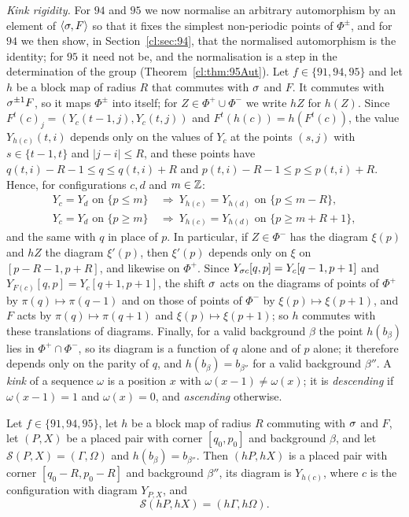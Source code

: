 \emph{Kink rigidity.} For $94$ and $95$ we now normalise an arbitrary automorphism by an element of $\langle\sigma,F\rangle$ so that it fixes the simplest non-periodic points of $\Phi^\pm$, and for $94$ we then show, in Section~\ref{cl:sec:94}, that the normalised automorphism is the identity; for $95$ it need not be, and the normalisation is a step in the determination of the group (Theorem~\ref{cl:thm:95Aut}). Let $f\in\{91,94,95\}$ and let $h$ be a block map of radius $R$ that commutes with $\sigma$ and $F$. It commutes with $\sigma^{\pm1}F$, so it maps $\Phi^\pm$ into itself; for $Z\in\Phi^+\cup\Phi^-$ we write $hZ$ for $h(Z)$. Since $F^t(c)_j=(Y_c(t-1,j),Y_c(t,j))$ and $F^t(h(c))=h(F^t(c))$, the value $Y_{h(c)}(t,i)$ depends only on the values of $Y_c$ at the points $(s,j)$ with $s\in\{t-1,t\}$ and $|j-i|\le R$, and these points have $q(t,i)-R-1\le q\le q(t,i)+R$ and $p(t,i)-R-1\le p\le p(t,i)+R$. Hence, for configurations $c,d$ and $m\in\mathbb{Z}$:
\begin{equation}\label{cl:eq:loc}
\begin{aligned}
Y_c=Y_d\text{ on }\{p\le m\}&\ \Rightarrow\ Y_{h(c)}=Y_{h(d)}\text{ on }\{p\le m-R\},\\
Y_c=Y_d\text{ on }\{p\ge m\}&\ \Rightarrow\ Y_{h(c)}=Y_{h(d)}\text{ on }\{p\ge m+R+1\},
\end{aligned}
\end{equation}
and the same with $q$ in place of $p$.
In particular, if $Z\in\Phi^-$ has the diagram $\xi(p)$ and $hZ$ the diagram $\xi'(p)$, then $\xi'(p)$ depends only on $\xi$ on $[p-R-1,p+R]$, and likewise on $\Phi^+$. Since $Y_{\sigma c}[q,p]=Y_c[q-1,p+1]$ and $Y_{F(c)}[q,p]=Y_c[q+1,p+1]$, the shift $\sigma$ acts on the diagrams of points of $\Phi^+$ by $\pi(q)\mapsto\pi(q-1)$ and on those of points of $\Phi^-$ by $\xi(p)\mapsto\xi(p+1)$, and $F$ acts by $\pi(q)\mapsto\pi(q+1)$ and $\xi(p)\mapsto\xi(p+1)$; so $h$ commutes with these translations of diagrams. Finally, for a valid background $\beta$ the point $h(b_\beta)$ lies in $\Phi^+\cap\Phi^-$, so its diagram is a function of $q$ alone and of $p$ alone; it therefore depends only on the parity of $q$, and $h(b_\beta)=b_{\beta''}$ for a valid background $\beta''$. A \emph{kink} of a sequence $\omega$ is a position $x$ with $\omega(x-1)\ne\omega(x)$; it is \emph{descending} if $\omega(x-1)=1$ and $\omega(x)=0$, and \emph{ascending} otherwise.

\begin{lemma}[intertwining]\label{cl:lem:inter}
Let $f\in\{91,94,95\}$, let $h$ be a block map of radius $R$ commuting with $\sigma$ and $F$, let $(P,X)$ be a placed pair with corner $[q_0,p_0]$ and background $\beta$, and let $\mathcal S(P,X)=(\Gamma,\Omega)$ and $h(b_\beta)=b_{\beta''}$. Then $(hP,hX)$ is a placed pair with corner $[q_0-R,p_0-R]$ and background $\beta''$, its diagram is $Y_{h(c)}$, where $c$ is the configuration with diagram $Y_{P,X}$, and
\[
\mathcal S(hP,hX)=(h\Gamma,h\Omega).
\]
\end{lemma}

